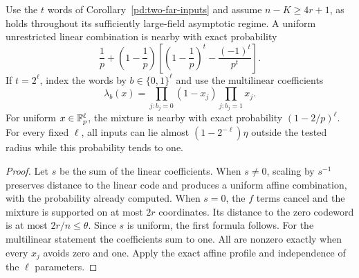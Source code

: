 \begin{corollary}
\label{pd:far-batching}
Use the $t$ words of Corollary~\ref{pd:two-far-inputs} and assume
$n-K\ge4r+1$, as holds throughout its sufficiently large-field
asymptotic regime. A uniform unrestricted linear combination is
nearby with exact probability
\[
 \frac1p+\left(1-\frac1p\right)
 \left[\left(1-\frac1p\right)^t-\frac{(-1)^t}{p^t}\right].
\]
If $t=2^\ell$, index the words by $b\in\{0,1\}^\ell$ and use the
multilinear coefficients
\[
 \lambda_b(x)=\prod_{j:b_j=0}(1-x_j)\prod_{j:b_j=1}x_j.
\]
For uniform $x\in\mathbb F_p^\ell$, the mixture is nearby with exact
probability $(1-2/p)^\ell$. For every fixed $\ell$, all inputs can
lie almost $(1-2^{-\ell})\eta$ outside the tested radius while this
probability tends to one.
\end{corollary}
\begin{proof}
Let $s$ be the sum of the linear coefficients. When $s\ne0$,
scaling by $s^{-1}$ preserves distance to the linear code and produces
a uniform affine combination, with the probability already computed.
When $s=0$, the $f$ terms cancel and the mixture is supported on at
most $2r$ coordinates. Its distance to the zero codeword is at most
$2r/n\le\theta$. Since $s$ is uniform, the first formula follows.
For the multilinear statement the coefficients sum to one. All are
nonzero exactly when every $x_j$ avoids zero and one. Apply the exact
affine profile and independence of the $\ell$ parameters.
\end{proof}
